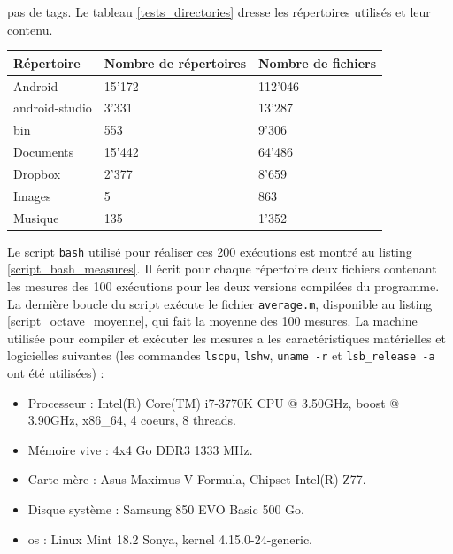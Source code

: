 pas de tags. Le tableau \ref{tests_directories} dresse les répertoires utilisés et leur contenu.
\begin{center}
    \begin{tabularx}{13cm}{|X|X|X|} \hline
        \textbf{Répertoire} & \textbf{Nombre de répertoires} & \textbf{Nombre de fichiers} \\ \hline
        Android & 15'172 & 112'046 \\ \hline
        android-studio & 3'331 & 13'287 \\ \hline
        bin & 553 & 9'306 \\ \hline
        Documents & 15'442 & 64'486 \\ \hline
        Dropbox & 2'377 & 8'659 \\ \hline
        Images & 5 & 863 \\ \hline
        Musique & 135 & 1'352 \\ \hline
    \end{tabularx}
    \label{tests_directories}
\end{center}
Le script \texttt{bash} utilisé pour réaliser ces 200 exécutions est montré au listing 
\ref{script_bash_measures}. Il écrit pour chaque répertoire deux fichiers contenant les mesures des 100 exécutions 
pour les deux versions compilées du programme. La dernière boucle du script exécute le fichier 
\texttt{average.m}, disponible au listing \ref{script_octave_moyenne}, qui fait la 
moyenne des 100 mesures.
La machine utilisée pour compiler et exécuter les mesures a les caractéristiques matérielles et 
logicielles suivantes (les commandes \texttt{lscpu}, \texttt{lshw}, 
\texttt{uname -r} et \texttt{lsb_release -a} ont été utilisées) :
\begin{itemize}
    \item Processeur : Intel(R) Core(TM) i7-3770K CPU @ 3.50GHz, boost @ 3.90GHz, x86\_64, 4 coeurs, 8 threads.
    \item Mémoire vive : 4x4 Go DDR3 1333 MHz.
    \item Carte mère : Asus Maximus V Formula, Chipset Intel(R) Z77.
    \item Disque système : Samsung 850 EVO Basic 500 Go.
    \item \acrshort{os} : Linux Mint 18.2 Sonya, kernel 4.15.0-24-generic.
\end{itemize}
\bigbreak
{}
